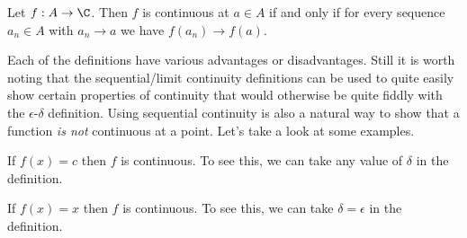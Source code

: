 \begin{proposition}
	Let $f : A \rightarrow \C$. Then $f$ is continuous at $a \in A$ if and only if for every sequence $a_n \in A$ with $a_n \rightarrow a$ we have $f(a_n) \rightarrow f(a)$.
\end{proposition}


Each of the definitions have various advantages or disadvantages.
Still it is worth noting that the sequential/limit continuity definitions can be used to quite easily show certain properties of continuity that would otherwise be quite fiddly with the $\epsilon$-$\delta$ definition. Using sequential continuity is also a natural way to show that a function \emph{is not} continuous at a point.
Let's take a look at some examples.

\begin{example}
	If $f(x) = c$ then $f$ is continuous. To see this, we can take any value of $\delta$ in the definition.
	\end{example}

\begin{example}[$f(x) = x$ is Continuous]
	If $f(x) = x$ then $f$ is continuous. To see this, we can take $\delta = \epsilon$ in the definition.
	\end{example}

